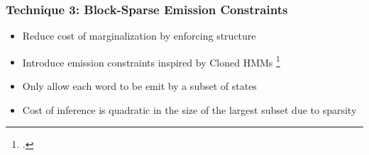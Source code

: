 \documentclass{beamer}
\begin{document}
\begin{frame}
\frametitle{Technique 3: Block-Sparse Emission Constraints}
\begin{itemize}
\item Reduce cost of marginalization by enforcing structure
\vspace{2em}
\item Introduce emission constraints inspired by Cloned HMMs \footcite{dedieu2019learning}
\vspace{2em}
\item Only allow each word to be emit by a subset of states
\vspace{2em}
\item Cost of inference is quadratic in the size of the largest subset
    due to sparsity
\end{itemize}
\end{frame}
\end{document}
